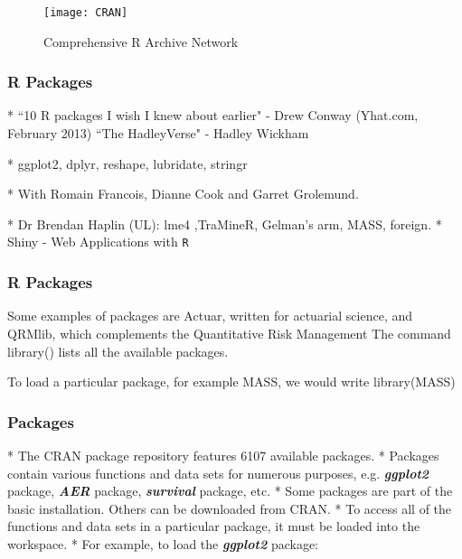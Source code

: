  
 
 
 
 
 \begin{figure}
 \centering
 \texttt{[image: CRAN]}
 \caption{Comprehensive R Archive Network}
 
 \end{figure}
 
 
 
 
 
 
 \frametitle{R Packages}
 
 
*  ``10 R packages I wish I knew about earlier" - Drew Conway (Yhat.com, February 2013)
 \bigskip*  ``The HadleyVerse" - Hadley Wickham
 
 
*   ggplot2, dplyr, reshape, lubridate, stringr
 
*   With Romain Francois, Dianne Cook and Garret Grolemund.

 \bigskip
*  Dr Brendan Haplin (UL): lme4 ,TraMineR, Gelman's arm, MASS, foreign. 
 \bigskip
*  Shiny - Web Applications with \texttt{R}

 
 
 \frametitle{R Packages}
 
 
 
 
 Some examples of packages are Actuar, written for actuarial science, and
 QRMlib, which complements the Quantitative Risk Management The command library()
 lists all the available packages. 
 
 To load a particular package, for example MASS, we would
 write
 library(MASS)
 
 
 
 
 \frametitle{Packages}
 
*  The CRAN package repository features 6107 available packages. 
*  Packages contain
 various functions and data sets for numerous purposes, e.g.
 \textbf{\textit{ggplot2}} package, \textbf{\textit{AER}} package, \textbf{\textit{survival}} package, etc.
*  Some packages are part of the basic installation. Others can be
 downloaded from CRAN.
*  To access all of the functions and data sets in a particular package,
 it must be loaded into the workspace. 
*  For example, to load the
 \textbf{\textit{ggplot2}} package:

